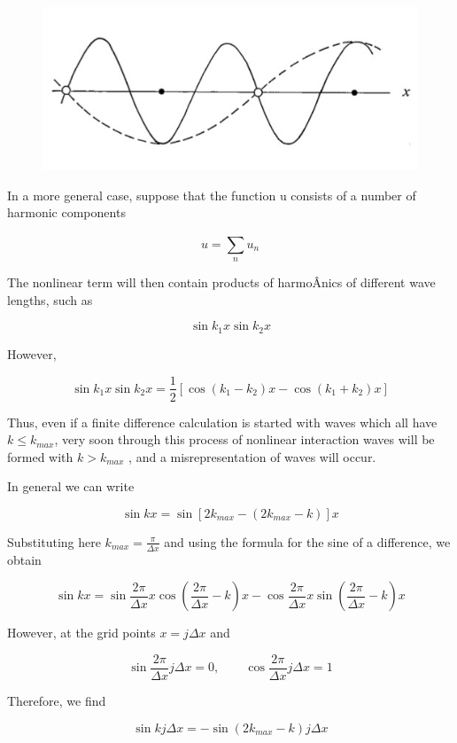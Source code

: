 \begin{figure}
\centering
\includegraphics[keepaspectratio]{figs/NM/pic61.jpg}
\caption{} \label{fig:}
\end{figure}

In a more general case, suppose that the function u consists of a number
of harmonic components

\[u = \sum_{n}^{}u_{n}\]

The nonlinear term will then contain products of harmoÂ­nics of different
wave lengths, such as

\[\sin{k_1}x\sin{k_2}x\]

However,

\[\sin{k_1 x}\sin{k_2 x} = \frac{1}{2}
\left\lbrack \cos{( k_{1} - k_{2} )x - \cos{( k_{1} + k_{2} )x}} \right\rbrack\]

Thus, even if a finite difference calculation is started with waves
which all have \(k \leq k_{max}\), very soon through this process of
nonlinear interaction waves will be formed with \(k > k_{max}\) , and a
misrepresentation of waves will occur.

In general we can write

\[\sin{kx} = \sin{\left[ 2 k_{max} - ( 2 k_{max} - k ) \right] x}\]

Substituting here \(k_{max} = \frac{\pi}{\Delta x}\) and using the
formula for the sine of a difference, we obtain

\[\sin{kx} = \sin{\frac{2\pi}{\Delta x}x}\cos{\left( \frac{2\pi}{\Delta x}
- k \right)}x - \cos{\frac{2\pi}{\Delta x}x}\sin{\left( \frac{2\pi}{\Delta x} - k \right)}x\]

However, at the grid points \(x = j\Delta x\) and

\[\sin\frac{2\pi}{\Delta x}j\Delta x = 0, \qquad \cos{\frac{2\pi}{\Delta x}j\Delta x = 1}\]

Therefore, we find

{\[\sin{k j \Delta x} = -\sin{\left( 2k_{max} - k \right)j\Delta x}\]}

